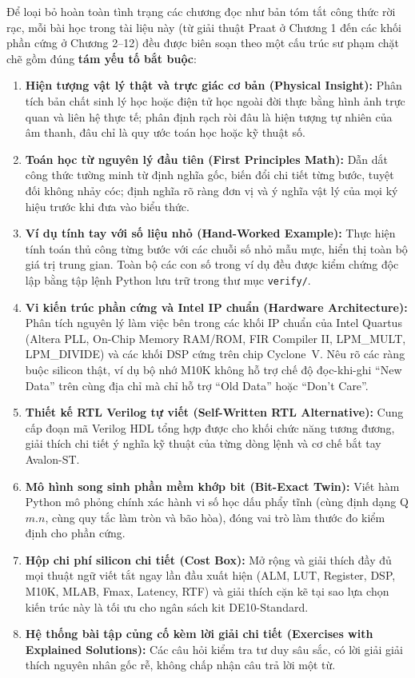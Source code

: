 Để loại bỏ hoàn toàn tình trạng các chương đọc như bản tóm tắt công thức rời rạc, mỗi bài học trong tài liệu này (từ giải thuật Praat ở Chương 1 đến các khối phần cứng ở Chương 2--12) đều được biên soạn theo một cấu trúc sư phạm chặt chẽ gồm đúng \textbf{tám yếu tố bắt buộc}:

\begin{enumerate}[leftmargin=1.4em]
    \item \textbf{Hiện tượng vật lý thật và trực giác cơ bản (Physical Insight):} Phân tích bản chất sinh lý học hoặc điện tử học ngoài đời thực bằng hình ảnh trực quan và liên hệ thực tế; phân định rạch ròi đâu là hiện tượng tự nhiên của âm thanh, đâu chỉ là quy ước toán học hoặc kỹ thuật số.
    \item \textbf{Toán học từ nguyên lý đầu tiên (First Principles Math):} Dẫn dắt công thức tường minh từ định nghĩa gốc, biến đổi chi tiết từng bước, tuyệt đối không nhảy cóc; định nghĩa rõ ràng đơn vị và ý nghĩa vật lý của mọi ký hiệu trước khi đưa vào biểu thức.
    \item \textbf{Ví dụ tính tay với số liệu nhỏ (Hand-Worked Example):} Thực hiện tính toán thủ công từng bước với các chuỗi số nhỏ mẫu mực, hiển thị toàn bộ giá trị trung gian. Toàn bộ các con số trong ví dụ đều được kiểm chứng độc lập bằng tập lệnh Python lưu trữ trong thư mục \texttt{verify/}.
    \item \textbf{Vi kiến trúc phần cứng và Intel IP chuẩn (Hardware Architecture):} Phân tích nguyên lý làm việc bên trong các khối IP chuẩn của Intel Quartus (Altera PLL, On-Chip Memory RAM/ROM, FIR Compiler II, LPM\_MULT, LPM\_DIVIDE) và các khối DSP cứng trên chip Cyclone~V. Nêu rõ các ràng buộc silicon thật, ví dụ bộ nhớ M10K không hỗ trợ chế độ đọc-khi-ghi ``New Data'' trên cùng địa chỉ mà chỉ hỗ trợ ``Old Data'' hoặc ``Don't Care''.
    \item \textbf{Thiết kế RTL Verilog tự viết (Self-Written RTL Alternative):} Cung cấp đoạn mã Verilog HDL tổng hợp được cho khối chức năng tương đương, giải thích chi tiết ý nghĩa kỹ thuật của từng dòng lệnh và cơ chế bắt tay Avalon-ST.
    \item \textbf{Mô hình song sinh phần mềm khớp bit (Bit-Exact Twin):} Viết hàm Python mô phỏng chính xác hành vi số học dấu phẩy tĩnh (cùng định dạng Q$m.n$, cùng quy tắc làm tròn và bão hòa), đóng vai trò làm thước đo kiểm định cho phần cứng.
    \item \textbf{Hộp chi phí silicon chi tiết (Cost Box):} Mở rộng và giải thích đầy đủ mọi thuật ngữ viết tắt ngay lần đầu xuất hiện (ALM, LUT, Register, DSP, M10K, MLAB, Fmax, Latency, RTF) và giải thích cặn kẽ tại sao lựa chọn kiến trúc này là tối ưu cho ngân sách kit DE10-Standard.
    \item \textbf{Hệ thống bài tập củng cố kèm lời giải chi tiết (Exercises with Explained Solutions):} Các câu hỏi kiểm tra tư duy sâu sắc, có lời giải giải thích nguyên nhân gốc rễ, không chấp nhận câu trả lời một từ.
\end{enumerate}

